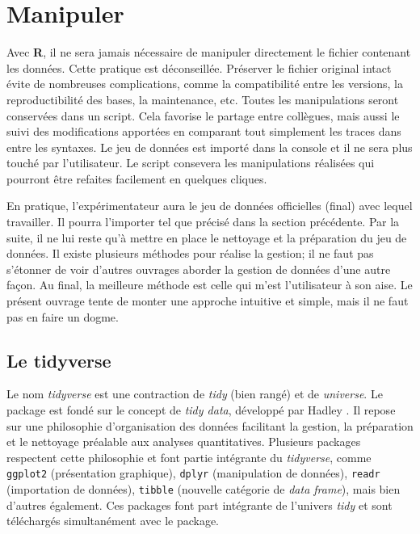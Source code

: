 \documentclass[
]{book}
\begin{document}
\hypertarget{manipuler}{%
\chapter{Manipuler}\label{manipuler}}

Avec \textbf{R}, il ne sera jamais nécessaire de manipuler directement le fichier contenant les données. Cette pratique est déconseillée. Préserver le fichier original intact évite de nombreuses complications, comme la compatibilité entre les versions, la reproductibilité des bases, la maintenance, etc. Toutes les manipulations seront conservées dans un script. Cela favorise le partage entre collègues, mais aussi le suivi des modifications apportées en comparant tout simplement les traces dans entre les syntaxes. Le jeu de données est importé dans la console et il ne sera plus touché par l'utilisateur. Le script consevera les manipulations réalisées qui pourront être refaites facilement en quelques cliques.

En pratique, l'expérimentateur aura le jeu de données officielles (final) avec lequel travailler. Il pourra l'importer tel que précisé dans la section précédente. Par la suite, il ne lui reste qu'à mettre en place le nettoyage et la préparation du jeu de données. Il existe plusieurs méthodes pour réalise la gestion; il ne faut pas s'étonner de voir d'autres ouvrages aborder la gestion de données d'une autre façon. Au final, la meilleure méthode est celle qui m'est l'utilisateur à son aise. Le présent ouvrage tente de monter une approche intuitive et simple, mais il ne faut pas en faire un dogme.

\hypertarget{le-tidyverse}{%
\section{Le tidyverse}\label{le-tidyverse}}

Le nom \emph{tidyverse} \autocite{tidy} est une contraction de \emph{tidy} (bien rangé) et de \emph{universe}. Le package est fondé sur le concept de \emph{tidy data}, développé par Hadley \autocite{Wickham14}. Il repose sur une philosophie d'organisation des données facilitant la gestion, la préparation et le nettoyage préalable aux analyses quantitatives. Plusieurs packages respectent cette philosophie et font partie intégrante du \emph{tidyverse}, comme \texttt{ggplot2} (présentation graphique), \texttt{dplyr} (manipulation de données), \texttt{readr} (importation de données), \texttt{tibble} (nouvelle catégorie de \emph{data frame}), mais bien d'autres également. Ces packages font part intégrante de l'univers \emph{tidy} et sont téléchargés simultanément avec le package.
\end{document}
